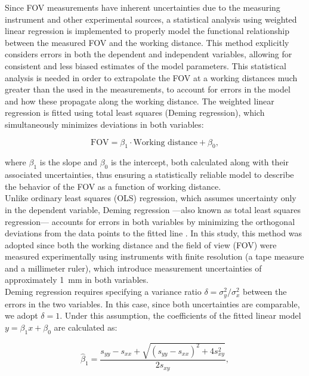 \noindent Since FOV measurements have inherent uncertainties due to the measuring instrument and other experimental sources, a statistical analysis using weighted linear regression is implemented to properly model the functional relationship between the measured FOV and the working distance. This method explicitly considers errors in both the dependent and independent variables, allowing for consistent and less biased estimates of the model parameters. This statistical analysis is needed in order to extrapolate the FOV at a working distances much greater than the used in the measurements, to account for errors in the model and how these propagate along the working distance. The weighted linear regression is fitted using total least squares (Deming regression), which simultaneously minimizes deviations in both variables:

\begin{equation}
\text{FOV} = \beta_1 \cdot \text{Working distance} + \beta_0,
\label{eq:regresion_lineal}
\end{equation}

\noindent where $\beta_1$ is the slope and $\beta_0$ is the intercept, both calculated along with their associated uncertainties, thus ensuring a statistically reliable model to describe the behavior of the FOV as a function of working distance.\\

\noindent Unlike ordinary least squares (OLS) regression, which assumes uncertainty only in the dependent variable, Deming regression ---also known as total least squares regression--- accounts for errors in both variables by minimizing the orthogonal deviations from the data points to the fitted line \cite{Deming1943ErrorsInVariables}. In this study, this method was adopted since both the working distance and the field of view (FOV) were measured experimentally using instruments with finite resolution (a tape measure and a millimeter ruler), which introduce measurement uncertainties of approximately \SI{1}{\milli\meter} in both variables. \\

\noindent Deming regression requires specifying a variance ratio $\delta = \sigma_y^2 / \sigma_x^2$ between the errors in the two variables. In this case, since both uncertainties are comparable, we adopt $\delta=1$. Under this assumption, the coefficients of the fitted linear model $y = \beta_1 x + \beta_0$ are calculated as:

\begin{equation}
\hat{\beta}_1 = \frac{s_{yy} - s_{xx} + \sqrt{(s_{yy} - s_{xx})^2 + 4s_{xy}^2}}{2s_{xy}},
\end{equation}

